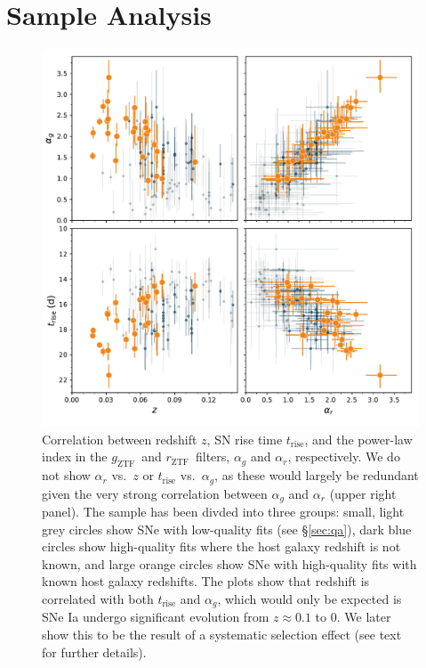 \documentclass[twocolumn]{aastex63}
\newcommand{\rztf}{$r_\mathrm{ZTF}$}
\newcommand{\gztf}{$g_\mathrm{ZTF}$}
\begin{document}
\section{Sample Analysis \label{sec:analysis}}

\begin{figure}
    \centering
    \includegraphics[width=1\linewidth]{./figures/param_correlations.pdf}
    \caption{Correlation between redshift $z$, SN rise time
    $t_\mathrm{rise}$, and the power-law index in the \gztf\ and \rztf\
    filters, $\alpha_g$ and $\alpha_r$, respectively. We do not show
    $\alpha_r$ vs.~$z$ or $t_\mathrm{rise}$ vs.~$\alpha_g$, as these would
    largely be redundant given the very strong correlation between $\alpha_g$
    and $\alpha_r$ (upper right panel). The sample has been divded into three
    groups: small, light grey circles show SNe with low-quality fits (see
    \S\ref{sec:qa}), dark blue circles show high-quality fits where the host
    galaxy redshift is not known, and large orange circles show SNe with high-quality
    fits with known host galaxy redshifts. The plots show that redshift is
    correlated with both $t_\mathrm{rise}$ and $\alpha_g$, which would only
    be expected is SNe Ia undergo significant evolution from $z \approx 0.1$
    to $0$. We later show this to be the result of a systematic selection
    effect (see text for further details). }
    \label{fig:model_parameters}
\end{figure}
\end{document}

